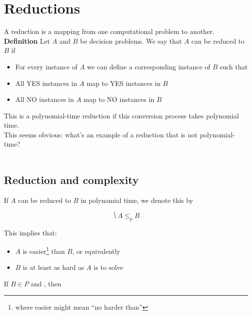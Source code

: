 \documentclass[11  pt]{article}
\begin{document}
	
\section{Reductions}
A reduction is a mapping from one computational problem to another.  \\ 

\textbf{Definition} Let $A$ and $B$ be decision problems. We say that $A$ can be reduced to $B$ if

\begin{itemize}
	\item For every instance of $A$ we can define a corresponding instance of $B$ such that
	\item All YES instances in $A$ map to YES instances in $B$
	\item All NO instances in $A$ map to NO instances in $B$
\end{itemize}

\vfill

This is a polynomial-time reduction if this conversion process takes polynomial time. \\

This seems obvious: what's an example of a reduction that is not polynomial-time? \\ \\

\vfill

\newpage
\subsection{Reduction and complexity}

If $A$ can be reduced to $B$ in polynomial time, we denote this by 

\begin{equation*}
	\hide{A \leq_p B}
\end{equation*}

This implies that:
\begin{itemize}
	\item $A$ is easier\footnote{where easier might mean ``no harder than''} than $B$, or equivalently 
	\item $B$ is at least as hard as $A$ is to solve\\
\end{itemize} 

\begin{lemma} 
	If $B \in P$ and , then 
\end{lemma}	
\end{document}
